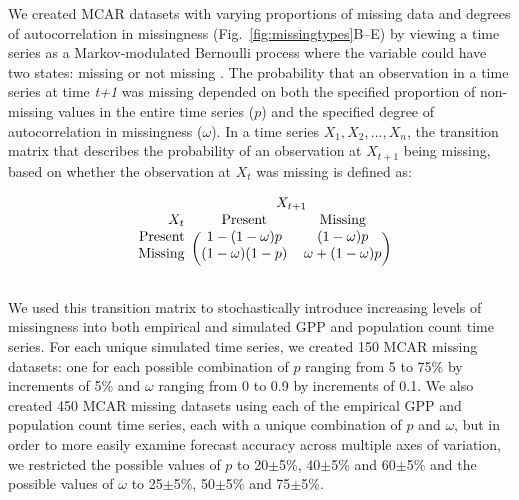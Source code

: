 \documentclass{article}
\begin{document}
We created MCAR datasets with varying proportions of missing data and degrees of autocorrelation in missingness (Fig.\ \ref{fig:missingtypes}B--E) by viewing a time series as a Markov-modulated Bernoulli process where the variable could have two states: missing or not missing \citep{Gharib2014, Edwards1960}. The probability that an observation in a time series at time \textit{t+1} was missing depended on both the specified proportion of non-missing values in the entire time series ($p$) and the specified degree of autocorrelation in missingness ($\omega$). In a time series $X_1, X_2, ..., X_n$, the transition matrix that describes the probability of an observation at $X_{t+1}$ being missing, based on whether the observation at $X_t$ was missing is defined as: 

\begin{equation}
\begin{blockarray}{rcccc}
\text{} & \BAmulticolumn{4}{c}{X_{t+1}}\\
X_t & \text{Present} & \text{Missing}  \\
\begin{block}{r(cccc)}
\text{Present} & 1-(1-\omega)p & (1-\omega)p \\
\text{Missing} & (1-\omega)(1-p) & \omega + (1-\omega)p  \\
[1ex]
\end{block}
\end{blockarray}
\end{equation}

\noindent We used this transition matrix to stochastically introduce increasing levels of missingness into both empirical and simulated GPP and population count time series. For each unique simulated time series, we created 150 MCAR missing datasets: one for each possible combination of $p$ ranging from 5 to 75\% by increments of 5\% and $\omega$ ranging from 0 to 0.9 by increments of 0.1. We also created 450 MCAR missing datasets using each of the empirical GPP and population count time series, each with a unique combination of $p$ and $\omega$, but in order to more easily examine forecast accuracy across multiple axes of variation, we restricted the possible values of $p$ to 20$\pm$5\%, 40$\pm$5\% and 60$\pm$5\% and the possible values of $\omega$ to 25$\pm$5\%, 50$\pm$5\% and 75$\pm$5\%.
\end{document}
